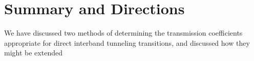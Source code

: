 \section{Summary and Directions}
We have discussed two methods of determining the transmission coefficients appropriate for direct interband tunneling transitions, and discussed how they might be extended